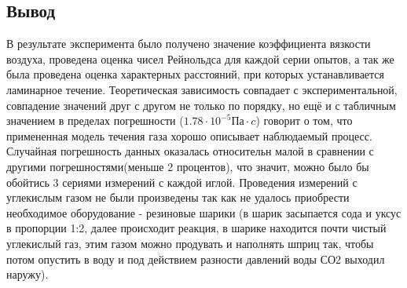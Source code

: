  \subsection{Вывод}
 В результате эксперимента было получено значение коэффициента вязкости воздуха, проведена оценка чисел Рейнольдса для каждой серии опытов, а так же была проведена оценка характерных расстояний, при которых устанавливается ламинарное течение. Теоретическая зависимость совпадает с экспериментальной, совпадение значений друг с другом не только по порядку, но ещё и с табличным значением в пределах погрешности ($1.78 \cdot 10^{-5} Па\cdot c$) говорит о том, что примененная модель течения газа хорошо описывает наблюдаемый процесс. Случайная погрешность данных оказалась относительн малой в сравнении с другими погрешностями(меньше 2 процентов), что значит, можно было бы обойтись 3 сериями измерений с каждой иглой. Проведения измерений с углекислым газом не были произведены так как не удалось приобрести необходимое оборудование - резиновые шарики (в шарик засыпается сода и уксус в пропорции 1:2, далее происходит реакция, в шарике находится почти чистый углекислый газ, этим газом можно продувать и наполнять шприц так, чтобы потом опустить в воду и под действием разности давлений воды СО2 выходил наружу). 

 \newpage

